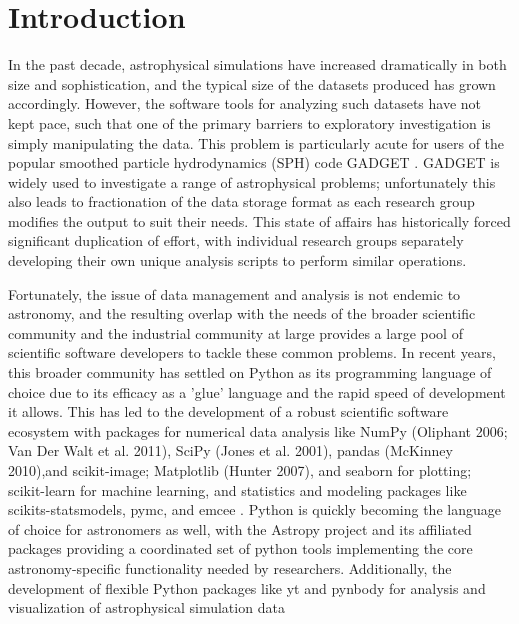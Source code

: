 \section{Introduction}
\label{intro}

In the past decade, astrophysical simulations have increased dramatically in both size and sophistication, and the typical size of the datasets produced has grown accordingly.  
However, the software tools for analyzing such datasets have not kept pace, such that one of the primary barriers to exploratory investigation is simply manipulating the data.  
This problem is particularly acute for users of the popular smoothed particle hydrodynamics (SPH) code GADGET \citep{SpringelYoshidaWhite2001,Springel2005}.  
GADGET is widely used to investigate a range of astrophysical problems; unfortunately this also leads to fractionation of the data storage format as each research group modifies the output to suit their needs.
This state of affairs has historically forced significant duplication of effort, with individual research groups separately developing their own unique analysis scripts to perform similar operations.

Fortunately, the issue of data management and analysis is not endemic to astronomy, and the resulting overlap with the needs of the broader scientific community and the industrial community at large provides a large pool of scientific software developers to tackle these common problems.
In recent years, this broader community has settled on Python as its programming language of choice due to its efficacy as a 'glue' language and the rapid speed of development it allows.  
This has led to the development of a robust scientific software ecosystem with packages for numerical data analysis like NumPy (Oliphant 2006; Van Der Walt et al. 2011), SciPy (Jones et al. 2001), pandas (McKinney 2010),and scikit-image; Matplotlib (Hunter 2007), and seaborn for plotting; scikit-learn for machine learning, and statistics and modeling packages like scikits-statsmodels, pymc, and emcee \citep{Foreman-Mackeyetal2013}.
Python is quickly becoming the language of choice for astronomers as well, with the Astropy project \citep{Robitailleetal2013} and its affiliated packages providing a coordinated set of python tools implementing the core astronomy-specific functionality needed by researchers. Additionally, the development of flexible Python packages like yt \citep{Turketal2011} and pynbody \citep{Pontzenetal2013} for analysis and visualization of astrophysical simulation data


